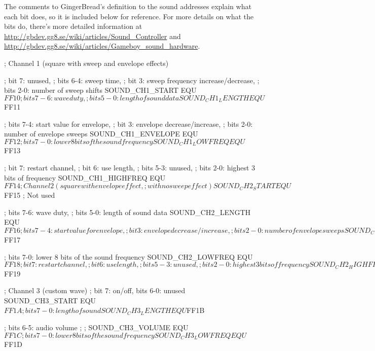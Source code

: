 \documentclass[11pt]{book}
\begin{document}
The comments to GingerBread’s definition to the sound addresses explain what each bit does, so it is included below for reference. For more details on what the bits do, there’s more detailed information at \url{http://gbdev.gg8.se/wiki/articles/Sound_Controller} and \url{http://gbdev.gg8.se/wiki/articles/Gameboy_sound_hardware}. 

\begin{code}
; Channel 1 (square with sweep and envelope effects)

; bit 7: unused, 
; bits 6-4: sweep time,
; bit 3: sweep frequency increase/decrease, 
; bits 2-0: number of sweep shifts
SOUND_CH1_START     EQU $FF10 

; bits 7-6: wave duty, 
; bits 5-0: length of sound data
SOUND_CH1_LENGTH    EQU $FF11 

; bits 7-4: start value for envelope, 
; bit 3: envelope decrease/increase, 
; bits 2-0: number of envelope sweeps
SOUND_CH1_ENVELOPE  EQU $FF12 

; bits 7-0: lower 8 bits of the sound frequency
SOUND_CH1_LOWFREQ   EQU $FF13

; bit 7: restart channel, 
; bit 6: use length, 
; bits 5-3: unused,
; bits 2-0: highest 3 bits of frequency 
SOUND_CH1_HIGHFREQ  EQU $FF14 

; Channel 2 (square with envelope effect,
; with no sweep effect)
SOUND_CH2_START     EQU $FF15 ; Not used 

; bits 7-6: wave duty,
; bits 5-0: length of sound data
SOUND_CH2_LENGTH    EQU $FF16 

; bits 7-4: start value for envelope,
; bit 3: envelope decrease/increase,
; bits 2-0: number of envelope sweeps
SOUND_CH2_ENVELOPE  EQU $FF17 

; bits 7-0: lower 8 bits of the sound frequency
SOUND_CH2_LOWFREQ   EQU $FF18 

; bit 7: restart channel,
; bit 6: use length,
; bits 5-3: unused,
; bits 2-0: highest 3 bits of frequency
SOUND_CH2_HIGHFREQ  EQU $FF19 

; Channel 3 (custom wave)
; bit 7: on/off, bits 6-0: unused
SOUND_CH3_START     EQU $FF1A
 
; bits 7-0: length of sound
SOUND_CH3_LENGTH    EQU $FF1B
 
; bits 6-5: audio volume 
; %
; %
SOUND_CH3_VOLUME    EQU $FF1C 

; bits 7-0: lower 8 bits of the sound frequency
SOUND_CH3_LOWFREQ   EQU $FF1D 


\end{code}
\end{document}
